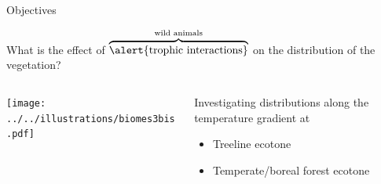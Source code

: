 \documentclass[10pt,aspectratio=149]{beamer}
\begin{document}

\begin{frame}{Objectives}


What is the effect of $\overbrace{\text{\alert{trophic interactions}}}^\text{wild animals}$ on the distribution of the vegetation?

\vspace{1em}

\begin{columns}
\begin{column}{0.5\textwidth}
\texttt{[image: ../../illustrations/biomes3bis.pdf]}
\end{column}
\begin{column}{0.5\textwidth}

Investigating distributions along the temperature gradient at

\begin{itemize}

\item Treeline ecotone
\item Temperate/boreal forest ecotone
\end{itemize}
\end{column}
\end{columns}

\end{frame}









\end{document}
